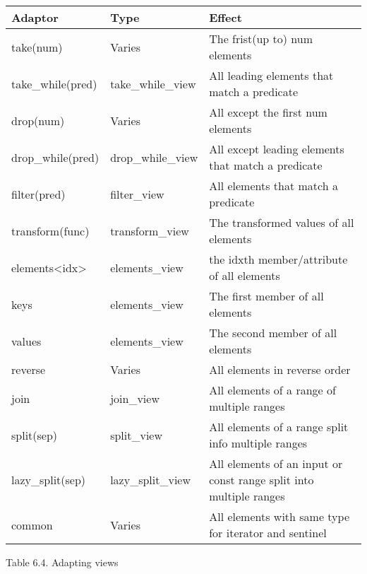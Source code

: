 \begin{longtable}[c]{|l|l|l|}
\hline
\textbf{Adaptor} & \textbf{Type}   & \textbf{Effect}                                       \\ \hline
\endfirsthead
%
\endhead
%
take(num)        & Varies          & The frist(up to) num elements                         \\ \hline
take\_while(pred)                    & take\_while\_view & All leading elements that match a predicate                        \\ \hline
drop(num)        & Varies          & All except the first num elements                     \\ \hline
drop\_while(pred)                    & drop\_while\_view & All except leading elements that match a predicate                 \\ \hline
filter(pred)     & filter\_view    & All elements that match a predicate                   \\ \hline
transform(func)  & transform\_view & The transformed values of all elements                \\ \hline
elements\textless{}idx\textgreater{} & elements\_view    & the idxth member/attribute of all elements                         \\ \hline
keys             & elements\_view  & The first member of all elements                      \\ \hline
values           & elements\_view  & The second member of all elements                     \\ \hline
reverse          & Varies          & All elements in reverse order                         \\ \hline
join             & join\_view      & All elements of a range of multiple ranges            \\ \hline
split(sep)       & split\_view     & All elements of a range split info multiple ranges    \\ \hline
lazy\_split(sep)                     & lazy\_split\_view & All elements of an input or const range split into multiple ranges \\ \hline
common           & Varies          & All elements with same type for iterator and sentinel \\ \hline
\end{longtable}

\begin{center}
Table 6.4. Adapting views
\end{center}

